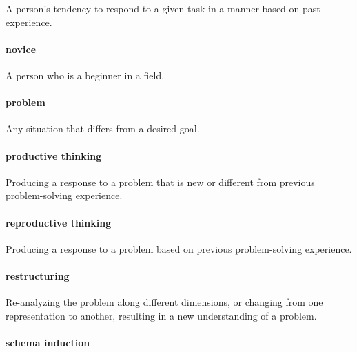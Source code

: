 \documentclass[
]{krantz}
\begin{document}
A person's tendency to respond to a given task in a manner based on past experience.

\hypertarget{novice}{%
\paragraph*{novice}\label{novice}}

A person who is a beginner in a field.

\hypertarget{problem}{%
\paragraph*{problem}\label{problem}}

Any situation that differs from a desired goal.

\hypertarget{productive-thinking}{%
\paragraph*{productive thinking}\label{productive-thinking}}

Producing a response to a problem that is new or different from previous problem-solving experience.

\hypertarget{reproductive-thinking}{%
\paragraph*{reproductive thinking}\label{reproductive-thinking}}

Producing a response to a problem based on previous problem-solving experience.

\hypertarget{restructuring}{%
\paragraph*{restructuring}\label{restructuring}}

Re-analyzing the problem along different dimensions, or changing from one representation to another, resulting in a new understanding of a problem.

\hypertarget{schema-induction}{%
\paragraph*{schema induction}\label{schema-induction}}
\end{document}
